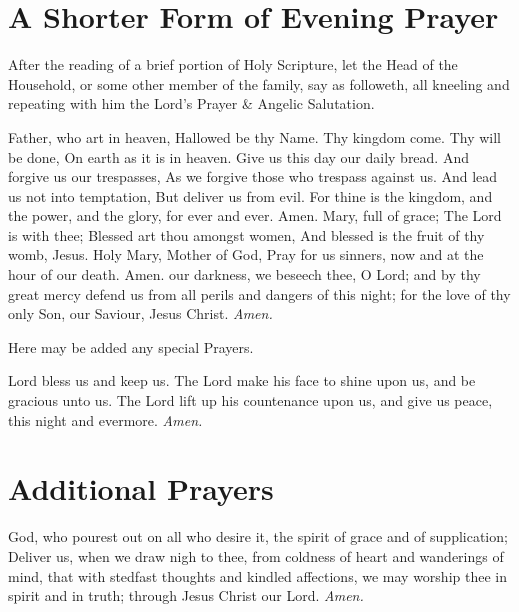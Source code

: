 \section*{A Shorter Form of Evening Prayer}
\begin{rubric}
    After the reading of a brief portion of Holy Scripture, let the Head of the Household, or some other member of the family, say as followeth, all kneeling and repeating with him the Lord's Prayer \& Angelic Salutation.
\end{rubric}
 Father, who art in heaven, Hallowed be thy Name. Thy kingdom come. Thy will be done, On earth as it is in heaven. Give us this day our daily bread. And forgive us our trespasses, As we forgive those who trespass against us. And lead us not into temptation, But deliver us from evil. For thine is the kingdom, and the power, and the glory, for ever and ever. Amen.
 Mary, full of grace; The Lord is with thee; Blessed art thou amongst women, And blessed is the fruit of thy womb, Jesus. Holy Mary, Mother of God, Pray for us sinners, now and at the hour of our death. Amen.
 our darkness, we beseech thee, O Lord; and by thy great mercy defend us from all perils and dangers of this night; for the love of thy only Son, our Saviour, Jesus Christ. \textit{Amen.}

\begin{rubric}
    Here may be added any special Prayers.
\end{rubric}
 Lord bless us and keep us. The Lord make his face to shine upon us, and be gracious unto us. The Lord {} lift up his countenance upon us, and give us peace, this night and evermore. \textit{Amen.}

\section*{Additional Prayers}
 God, who pourest out on all who desire it, the spirit of grace and of supplication; Deliver us, when we draw nigh to thee, from coldness of heart and wanderings of mind, that with stedfast thoughts and kindled affections, we may worship thee in spirit and in truth; through Jesus Christ our Lord. \textit{Amen.}


